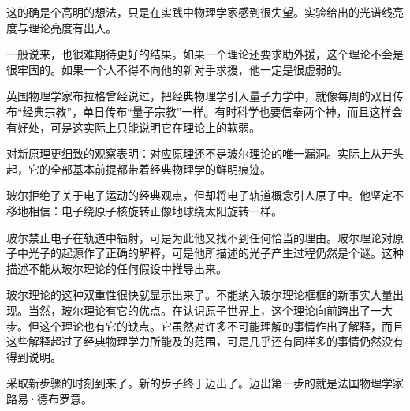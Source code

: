 这的确是个高明的想法，只是在实践中物理学家感到很失望。实验给出的光谱线亮度与理论亮度有出入。

一般说来，也很难期待更好的结果。如果一个理论还要求助外援，这个理论不会是很牢固的。如果一个人不得不向他的新对手求援，他一定是很虚弱的。

英国物理学家布拉格曾经说过，把经典物理学引入量子力学中，就像每周的双日传布“经典宗教”，单日传布“量子宗教”一样。有时科学也要信奉两个神，而且这样会有好处，可是这实际上只能说明它在理论上的软弱。

对新原理更细致的观察表明：对应原理还不是玻尔理论的唯一漏洞。实际上从开头起，它的全部基本前提都带着经典物理学的鲜明痕迹。

玻尔拒绝了关于电子运动的经典观点，但却将电子轨道概念引人原子中。他坚定不移地相信：电子绕原子核旋转正像地球绕太阳旋转一样。

玻尔禁止电子在轨道中辐射，可是为此他又找不到任何恰当的理由。玻尔理论对原子中光子的起源作了正确的解释，可是他所描述的光子产生过程仍然是个谜。这种描述不能从玻尔理论的任何假设中推导出来。

玻尔理论的这种双重性很快就显示出来了。不能纳入玻尔理论框框的新事实大量出现。当然，玻尔理论有它的优点。在认识原子世界上，这个理论向前跨出了一大步。但这个理论也有它的缺点。它虽然对许多不可能理解的事情作出了解释，而且这些解释超过了经典物理学力所能及的范围，可是几乎还有同样多的事情仍然没有得到说明。

采取新步骤的时刻到来了。新的步子终于迈出了。迈出第一步的就是法国物理学家路易·德布罗意。